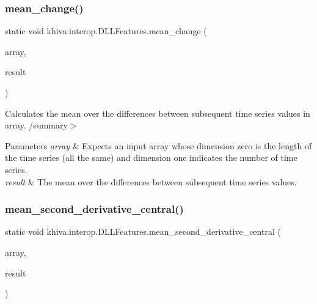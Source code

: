\subsubsection{\texorpdfstring{mean\+\_\+change()}{mean\_change()}}
{\footnotesize\ttfamily static void khiva.\+interop.\+D\+L\+L\+Features.\+mean\+\_\+change (\begin{DoxyParamCaption}\item[{\mbox{[}\+In\mbox{]} ref Int\+Ptr}]{array,  }\item[{\mbox{[}\+Out\mbox{]} out Int\+Ptr}]{result }\end{DoxyParamCaption})\hspace{0.3cm}{\ttfamily [static]}}



Calculates the mean over the differences between subsequent time series values in array. /summary$>$ 
\begin{DoxyParams}{Parameters}
{\em array} & Expects an input array whose dimension zero is the length of the time series (all the same) and dimension one indicates the number of time series.\\
\hline
{\em result} & The mean over the differences between subsequent time series values.\\
\hline
\end{DoxyParams}


\mbox{\label{classkhiva_1_1interop_1_1_d_l_l_features_a3676b48b12dc2a86e796c29ab37ec02f}} 
\subsubsection{\texorpdfstring{mean\+\_\+second\+\_\+derivative\+\_\+central()}{mean\_second\_derivative\_central()}}
{\footnotesize\ttfamily static void khiva.\+interop.\+D\+L\+L\+Features.\+mean\+\_\+second\+\_\+derivative\+\_\+central (\begin{DoxyParamCaption}\item[{\mbox{[}\+In\mbox{]} ref Int\+Ptr}]{array,  }\item[{\mbox{[}\+Out\mbox{]} out Int\+Ptr}]{result }\end{DoxyParamCaption})\hspace{0.3cm}{\ttfamily [static]}}



